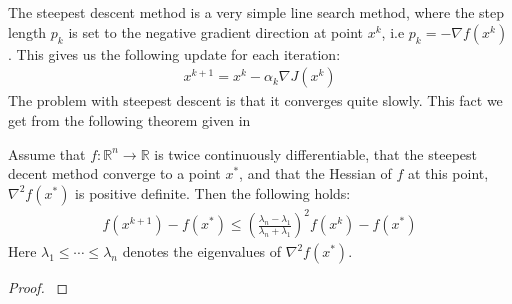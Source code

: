 \\
\\
The steepest descent method is a very simple line search method, where the step length $p_k$ is set to the negative gradient direction at point $x^k$, i.e $p_k = -\nabla f(x^k)$. This gives us the following update for each iteration:
\begin{align*}
x^{k+1} = x^k - \alpha_k \nabla J(x^k)
\end{align*} 
The problem with steepest descent is that it converges quite slowly. This fact we get from the following theorem given in \cite{nocedal2006numerical}
\begin{theorem}
Assume that $f:\mathbb{R}^n\longrightarrow\mathbb{R}$ is twice continuously differentiable, that the steepest decent method converge to a point $x^*$, and that the Hessian of $f$ at this point, $\nabla^2 f(x^*)$ is positive definite. Then the following holds:
\begin{align*}
f(x^{k+1})-f(x^*) \leq (\frac{\lambda_n-\lambda_1}{\lambda_n+\lambda_1})^2 f(x^{k})-f(x^*)
\end{align*}  
Here $\lambda_1\leq\cdots\leq \lambda_n$ denotes the eigenvalues of $\nabla^2 f(x^*)$.
\end{theorem}   
\begin{proof}
\cite{nocedal2006numerical}
\end{proof}
